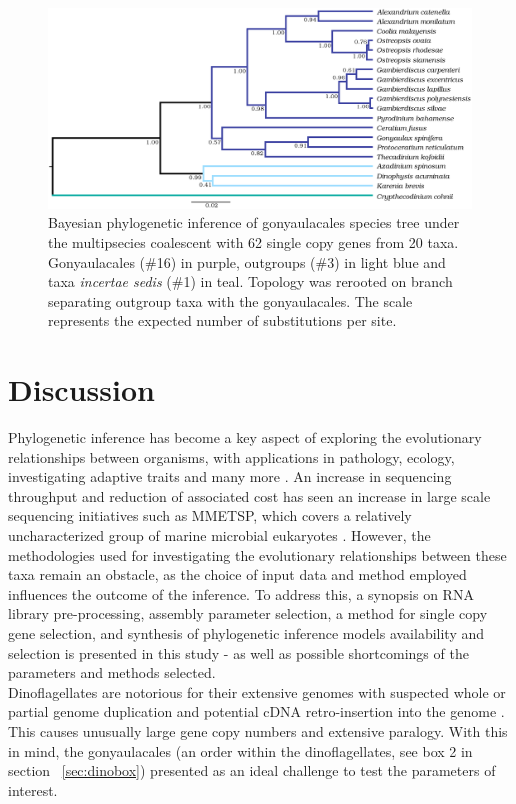 \documentclass[12pt]{article}
\begin{document}
\begin{figure} 
\includegraphics[scale=.25]{figures/Aug2_20-taxa-combined-fig_MCC_trees.png} 
\caption{Bayesian phylogenetic inference of gonyaulacales species tree under the multipsecies coalescent with 62 single copy genes from 20 taxa. Gonyaulacales (\#16) in purple, outgroups (\#3) in light blue and taxa \textit{incertae sedis} (\#1) in teal. Topology was rerooted on branch separating outgroup taxa with the gonyaulacales. The scale represents the expected number of substitutions per site.} 
\label{fig:SCmscBI}
\end{figure} 
\FloatBarrier

\newpage
\section{Discussion}
Phylogenetic inference has become a key aspect of exploring the evolutionary relationships between organisms, with applications in pathology, ecology, investigating adaptive traits and many more \cite{heath2008taxon}. 
An increase in sequencing throughput and reduction of associated cost has seen an increase in large scale sequencing initiatives such as MMETSP, which covers a relatively uncharacterized group of marine microbial eukaryotes \cite{keeling2014marine}.
However, the methodologies used for investigating the evolutionary relationships between these taxa remain an obstacle, as the choice of input data and method employed influences the outcome of the inference. 
To address this, a synopsis on RNA library pre-processing, assembly parameter selection, a method for single copy gene selection, and synthesis of phylogenetic inference models availability and selection is presented in this study - as well as possible shortcomings of the parameters and methods selected. \\
Dinoflagellates are notorious for their extensive genomes with suspected whole or partial genome duplication and potential cDNA retro-insertion into the genome \cite{van2009florida,beauchemin2012dinoflagellate,slamovits2008widespread,hou2009distinct,lin2011genomic}. 
This causes unusually large gene copy numbers and extensive paralogy. 
With this in mind, the gonyaulacales (an order within the dinoflagellates, see box 2  in section ~\ref{sec:dinobox}) presented as an ideal challenge to test the parameters of interest.
\end{document}
